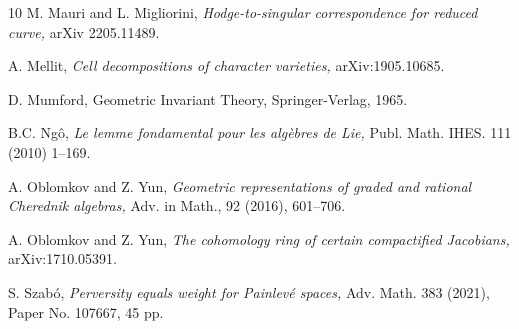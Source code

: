 \documentclass[11pt]{amsart}
\theoremstyle{plain}
\theoremstyle{definition}
\theoremstyle{remark}
\begin{document}
\begin{thebibliography}{10}
 M. Mauri and L. Migliorini, {\em Hodge-to-singular correspondence for reduced curve,} arXiv 2205.11489.

 A. Mellit, {\em Cell decompositions of character varieties,} arXiv:1905.10685.








 D. Mumford, Geometric Invariant Theory, Springer-Verlag, 1965.



 B.C. Ng\^{o}, {\em Le lemme fondamental pour les alg\`{e}bres de Lie, } Publ. Math. IHES. 111 (2010) 1--169.


 A. Oblomkov and Z. Yun, {\em Geometric representations of graded and rational Cherednik algebras,} Adv. in Math., 92 (2016), 601--706.

 A. Oblomkov and Z. Yun, {\em The cohomology ring of certain compactified Jacobians,} arXiv:1710.05391.


 S. Szabó, {\em Perversity equals weight for Painlevé spaces,} Adv. Math. 383 (2021), Paper No. 107667, 45 pp.




\end{thebibliography}
\end{document}
